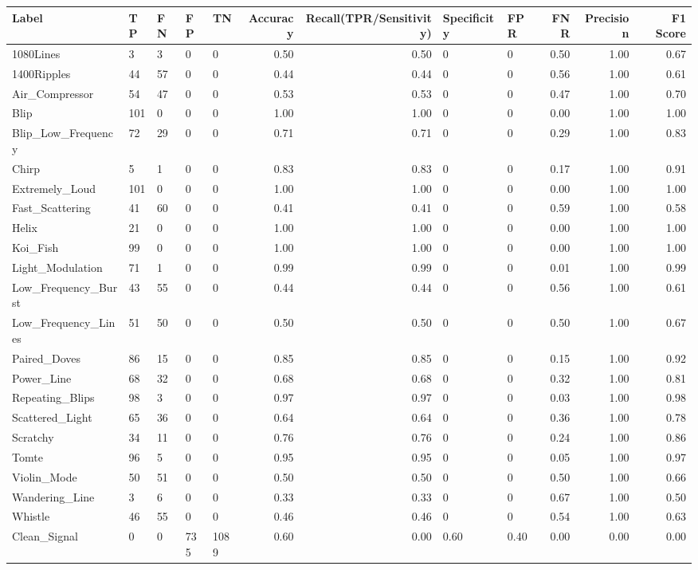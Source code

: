\begin{tabular}{lllllrrllrrr}
\toprule
Label & TP & FN & FP & TN & Accuracy & Recall(TPR/Sensitivity) & Specificity & FPR & FNR & Precision & F1 Score \\
\midrule
1080Lines & 3 & 3 & 0 & 0 & 0.50 & 0.50 & 0 & 0 & 0.50 & 1.00 & 0.67 \\
1400Ripples & 44 & 57 & 0 & 0 & 0.44 & 0.44 & 0 & 0 & 0.56 & 1.00 & 0.61 \\
Air\_Compressor & 54 & 47 & 0 & 0 & 0.53 & 0.53 & 0 & 0 & 0.47 & 1.00 & 0.70 \\
Blip & 101 & 0 & 0 & 0 & 1.00 & 1.00 & 0 & 0 & 0.00 & 1.00 & 1.00 \\
Blip\_Low\_Frequency & 72 & 29 & 0 & 0 & 0.71 & 0.71 & 0 & 0 & 0.29 & 1.00 & 0.83 \\
Chirp & 5 & 1 & 0 & 0 & 0.83 & 0.83 & 0 & 0 & 0.17 & 1.00 & 0.91 \\
Extremely\_Loud & 101 & 0 & 0 & 0 & 1.00 & 1.00 & 0 & 0 & 0.00 & 1.00 & 1.00 \\
Fast\_Scattering & 41 & 60 & 0 & 0 & 0.41 & 0.41 & 0 & 0 & 0.59 & 1.00 & 0.58 \\
Helix & 21 & 0 & 0 & 0 & 1.00 & 1.00 & 0 & 0 & 0.00 & 1.00 & 1.00 \\
Koi\_Fish & 99 & 0 & 0 & 0 & 1.00 & 1.00 & 0 & 0 & 0.00 & 1.00 & 1.00 \\
Light\_Modulation & 71 & 1 & 0 & 0 & 0.99 & 0.99 & 0 & 0 & 0.01 & 1.00 & 0.99 \\
Low\_Frequency\_Burst & 43 & 55 & 0 & 0 & 0.44 & 0.44 & 0 & 0 & 0.56 & 1.00 & 0.61 \\
Low\_Frequency\_Lines & 51 & 50 & 0 & 0 & 0.50 & 0.50 & 0 & 0 & 0.50 & 1.00 & 0.67 \\
Paired\_Doves & 86 & 15 & 0 & 0 & 0.85 & 0.85 & 0 & 0 & 0.15 & 1.00 & 0.92 \\
Power\_Line & 68 & 32 & 0 & 0 & 0.68 & 0.68 & 0 & 0 & 0.32 & 1.00 & 0.81 \\
Repeating\_Blips & 98 & 3 & 0 & 0 & 0.97 & 0.97 & 0 & 0 & 0.03 & 1.00 & 0.98 \\
Scattered\_Light & 65 & 36 & 0 & 0 & 0.64 & 0.64 & 0 & 0 & 0.36 & 1.00 & 0.78 \\
Scratchy & 34 & 11 & 0 & 0 & 0.76 & 0.76 & 0 & 0 & 0.24 & 1.00 & 0.86 \\
Tomte & 96 & 5 & 0 & 0 & 0.95 & 0.95 & 0 & 0 & 0.05 & 1.00 & 0.97 \\
Violin\_Mode & 50 & 51 & 0 & 0 & 0.50 & 0.50 & 0 & 0 & 0.50 & 1.00 & 0.66 \\
Wandering\_Line & 3 & 6 & 0 & 0 & 0.33 & 0.33 & 0 & 0 & 0.67 & 1.00 & 0.50 \\
Whistle & 46 & 55 & 0 & 0 & 0.46 & 0.46 & 0 & 0 & 0.54 & 1.00 & 0.63 \\
Clean\_Signal & 0 & 0 & 735 & 1089 & 0.60 & 0.00 & 0.60 & 0.40 & 0.00 & 0.00 & 0.00 \\
\bottomrule
\end{tabular}
